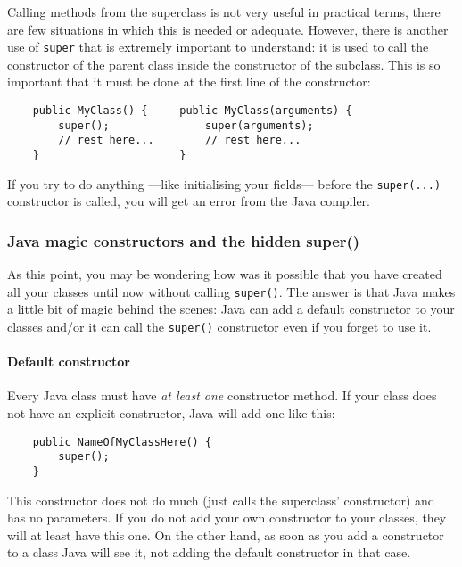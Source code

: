 Calling methods from the superclass is not very useful in practical
terms, there are few situations in which this is needed or
adequate. However, there is another use of \verb+super+ that is extremely important to
understand: it is used to call the constructor of the parent class
inside the constructor of the subclass. This is so important that it must be
done at the first line of the constructor: 

\begin{verbatim}
    public MyClass() {     public MyClass(arguments) {
        super();               super(arguments);
        // rest here...        // rest here...    
    }                      }
\end{verbatim}

If you try to do anything ---like initialising your fields--- before
the \verb+super(...)+ constructor is called, you will get an error
from the Java compiler. 

\subsubsection*{Java magic constructors and the hidden super()}
\label{sec:hidden-super}

As this point, you may be wondering how was it possible that you have
created all your classes until now without calling \verb+super()+. The
answer is that Java makes a little bit of magic behind the scenes:
Java can add a default constructor to your classes and/or it can call
the \verb+super()+ constructor even if you forget to use it. 

\paragraph{Default constructor}
\label{sec:default-constructor}

Every Java class must have \emph{at least one} constructor method. If your
class does not have an explicit constructor, Java will add one like
this: 

\begin{verbatim}
    public NameOfMyClassHere() {
        super();
    }
\end{verbatim}

This constructor does not do much (just calls the superclass'
constructor) and has no parameters. If you do not add your own
constructor to your classes, they will at least have this one. On the
other hand, as soon as you add a constructor to a class Java will see
it, not adding the default constructor in that case.

